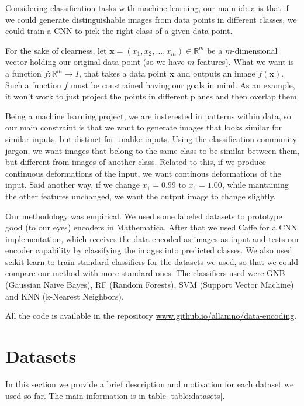 \documentclass[11pt]{article}
\begin{document}
Considering classification tasks with machine learning, our main ideia is that if we could generate distinguishable images from data points in different classes, we could train a CNN to pick the right class of a given data point. 

For the sake of clearness, let $\mathbf{x} = (x_1, x_2, \dots, x_m) \in \mathbb{R}^m$ be a $m$-dimensional vector holding our original data point (so we have $m$ features). What we want is a function $f: \mathbb{R}^m \rightarrow I$, that takes a data point $\mathbf{x}$ and outputs an image $f(\mathbf{x})$. Such a function $f$ must be constrained having our goals in mind. As an example, it won't work to just project the points in different planes and then overlap them.

Being a machine learning project, we are insterested in patterns within data, so our main constraint is that we want to generate images that looks similar for similar inputs, but distinct for unalike inputs. Using the classification community jargon, we want images that belong to the same class to be similar between them, but different from images of another class. Related to this, if we produce continuous deformations of the input, we want continous deformations of the input. Said another way, if we change $x_1 = 0.99$ to $x_1 = 1.00$, while mantaining the other features unchanged, we want the output image to change slightly.

Our methodology was empirical. We used some labeled datasets to prototype good (to our eyes) encoders in Mathematica. After that we used Caffe for a CNN implementation, which receives the data encoded as images as input and tests our encoder capability by classifying the images into predicted classes. We also used scikit-learn to train standard classifiers for the datasets we used, so that we could compare our method with more standard ones. The classifiers used were GNB (Gaussian Naive Bayes), RF (Random Forests), SVM (Support Vector Machine) and KNN (k-Nearest Neighbors).

All the code is available in the repository \href{www.github.io/allanino/data-encoding}{www.github.io/allanino/data-encoding}.

\section{Datasets} \label{sec:datasets}

In this section we provide a brief description and motivation for each dataset we used so far. The main information is in table \ref{table:datasets}.
\end{document}
